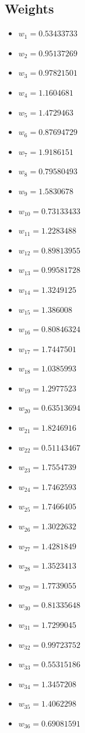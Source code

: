 \documentclass[11pt]{article}
\begin{document}
\subsection*{Weights}
\begin{itemize}
\item $w_{1} = 0.53433733$
\item $w_{2} = 0.95137269$
\item $w_{3} = 0.97821501$
\item $w_{4} = 1.1604681$
\item $w_{5} = 1.4729463$
\item $w_{6} = 0.87694729$
\item $w_{7} = 1.9186151$
\item $w_{8} = 0.79580493$
\item $w_{9} = 1.5830678$
\item $w_{10} = 0.73133433$
\item $w_{11} = 1.2283488$
\item $w_{12} = 0.89813955$
\item $w_{13} = 0.99581728$
\item $w_{14} = 1.3249125$
\item $w_{15} = 1.386008$
\item $w_{16} = 0.80846324$
\item $w_{17} = 1.7447501$
\item $w_{18} = 1.0385993$
\item $w_{19} = 1.2977523$
\item $w_{20} = 0.63513694$
\item $w_{21} = 1.8246916$
\item $w_{22} = 0.51143467$
\item $w_{23} = 1.7554739$
\item $w_{24} = 1.7462593$
\item $w_{25} = 1.7466405$
\item $w_{26} = 1.3022632$
\item $w_{27} = 1.4281849$
\item $w_{28} = 1.3523413$
\item $w_{29} = 1.7739055$
\item $w_{30} = 0.81335648$
\item $w_{31} = 1.7299045$
\item $w_{32} = 0.99723752$
\item $w_{33} = 0.55315186$
\item $w_{34} = 1.3457208$
\item $w_{35} = 1.4062298$
\item $w_{36} = 0.69081591$

\end{itemize}
\end{document}
